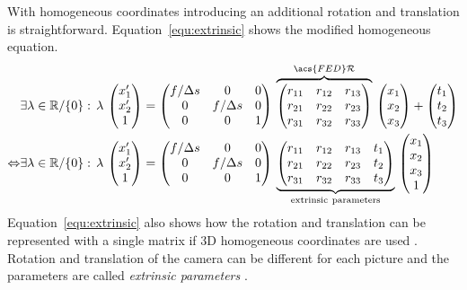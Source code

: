 \documentclass[12pt,a4paper,oneside,openright]{book}
\newcommand{\equ}[1]{Equation~\ref{equ:#1}}
\begin{document}
\begin{CJK}{UTF8}{}
With homogeneous coordinates introducing an additional rotation and translation is straightforward. \equ{extrinsic} shows the modified homogeneous equation.
\begin{equation}
  \begin{split}
    &\exists\lambda\in\mathbb{R}/\{0\}:\,\lambda\,\begin{pmatrix}x^\prime_1\\x^\prime_2\\1\end{pmatrix}=
    \begin{pmatrix}f/\Delta s&0&0\\0&f/\Delta s&0\\0&0&1\end{pmatrix}\,
    \overbrace{\begin{pmatrix}r_{11}&r_{12}&r_{13}\\r_{21}&r_{22}&r_{23}\\r_{31}&r_{32}&r_{33}\end{pmatrix}}^{\acs{FED}\mathcal{R}}\,
    \begin{pmatrix}x_1\\x_2\\x_3\end{pmatrix}+
    \begin{pmatrix}t_1\\t_2\\t_3\end{pmatrix}\\
    \Leftrightarrow&\exists\lambda\in\mathbb{R}/\{0\}:\,\lambda\,\begin{pmatrix}x^\prime_1\\x^\prime_2\\1\end{pmatrix}=
    \begin{pmatrix}f/\Delta s&0&0\\0&f/\Delta s&0\\0&0&1\end{pmatrix}\,
    \underbrace{\begin{pmatrix}r_{11}&r_{12}&r_{13}&t_1\\r_{21}&r_{22}&r_{23}&t_2\\r_{31}&r_{32}&r_{33}&t_3\end{pmatrix}}_{\mathrm{extrinsic\ parameters}}\,
    \begin{pmatrix}x_1\\x_2\\x_3\\1\end{pmatrix}
  \end{split}\label{equ:extrinsic}
\end{equation}
\equ{extrinsic} also shows how the rotation and translation can be represented with a single matrix if \ac{3D} homogeneous coordinates are used \citep{zhang2000flexible}. Rotation and translation of the camera can be different for each picture and the parameters are called \emph{extrinsic parameters} \citep{zhang2000flexible}.


\end{CJK}
\end{document}
